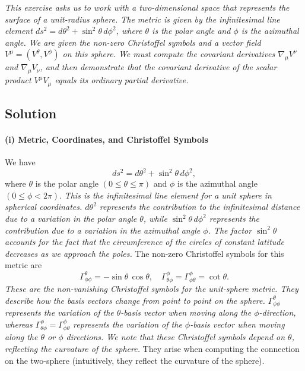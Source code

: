 \documentclass{article}
\begin{document}
\emph{This exercise asks us to work with a two-dimensional space that represents the surface of a unit-radius sphere. The metric is given by the infinitesimal line element \(ds^2 = d\theta^2 + \sin^2\theta \, d\phi^2\), where \(\theta\) is the polar angle and \(\phi\) is the azimuthal angle. We are given the non-zero Christoffel symbols and a vector field \(V^\mu = (V^\theta, V^\phi)\) on this sphere. We must compute the covariant derivatives \(\nabla_\mu V^\nu\) and \(\nabla_\mu V_\nu\), and then demonstrate that the covariant derivative of the scalar product \(V^\mu V_\mu\) equals its ordinary partial derivative.}

\subsection*{Solution}

\paragraph*{(i) Metric, Coordinates, and Christoffel Symbols}
We have
\[
ds^2 = d\theta^2 + \sin^2\theta \, d\phi^2,
\]
where \(\theta\) is the polar angle \((0 \leq \theta \leq \pi)\) and \(\phi\) is the azimuthal angle \((0 \leq \phi < 2\pi)\).
\emph{This is the infinitesimal line element for a unit sphere in spherical coordinates. \(d\theta^2\) represents the contribution to the infinitesimal distance due to a variation in the polar angle \(\theta\), while \(\sin^2\theta \, d\phi^2\) represents the contribution due to a variation in the azimuthal angle \(\phi\). The factor \(\sin^2\theta\) accounts for the fact that the circumference of the circles of constant latitude decreases as we approach the poles.}
The non-zero Christoffel symbols for this metric are
\[
\Gamma^\theta_{\phi\phi} = -\sin\theta\,\cos\theta,
\quad
\Gamma^\phi_{\theta\phi} = \Gamma^\phi_{\phi\theta} = \cot\theta.
\]
\emph{These are the non-vanishing Christoffel symbols for the unit-sphere metric. They describe how the basis vectors change from point to point on the sphere. \(\Gamma^\theta_{\phi\phi}\) represents the variation of the \(\theta\)-basis vector when moving along the \(\phi\)-direction, whereas \(\Gamma^\phi_{\theta\phi} = \Gamma^\phi_{\phi\theta}\) represents the variation of the \(\phi\)-basis vector when moving along the \(\theta\) or \(\phi\) directions. We note that these Christoffel symbols depend on \(\theta\), reflecting the curvature of the sphere.}
They arise when computing the connection on the two-sphere (intuitively, they reflect the curvature of the sphere).
\end{document}
